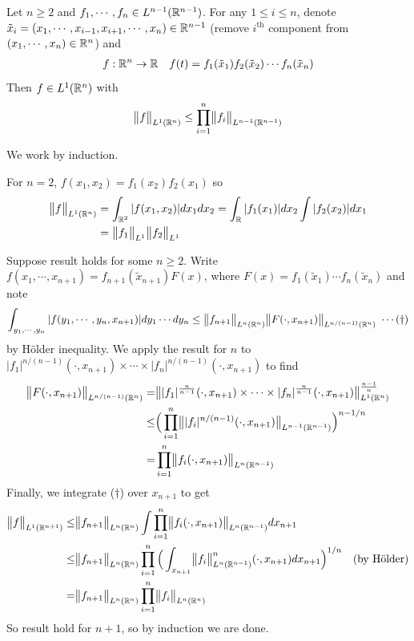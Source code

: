 \documentclass[10pt,a4paper]{report}
\newenvironment{proof}
{\begin{changemargin}{1cm}{0.5cm} 
	}%
	{\end{changemargin}
}
\begin{document}
\lem Let $n\geq 2$ and $f_1, \cdots, f_n \in L^{n-1}(\mathbb{R}^{n-1})$. For any $1\leq i\leq n$, denote $\tilde{x}_i = (x_1, \cdots, x_{i-1}, x_{i+1}, \cdots, x_n) \in \mathbb{R}^{n-1}$ (remove $i^{\text{th}}$ component from $(x_1, \cdots, x_n) \in \mathbb{R}^n$) and
\begin{align*}
f : \mathbb{R}^n \rightarrow \mathbb{R} \quad f(t) = f_1(\tilde{x}_1) f_2(\tilde{x}_2) \cdots f_n(\tilde{x}_n)
\end{align*}
Then $f\in L^1(\mathbb{R}^n)$ with
\begin{align*}
\bigl\lVert f\bigr\rVert_{L^1(\mathbb{R}^n)} \leq \prod_{i=1}^n \bigl\lVert f_i\bigr\rVert_{L^{n-1}(\mathbb{R}^{n-1})}
\end{align*}
\begin{proof}
\pf We work by induction.

\quad For $n=2$, $f(x_1,x_2) = f_1(x_2)f_2(x_1)$ so
\begin{align*}
\bigl\lVert f\bigr\rVert_{L^1(\mathbb{R}^n)} &= \int_{\mathbb{R}^2} |f(x_1,x_2)| dx_1 dx_2 = \int_{\mathbb{R}} |f_1(x_1)| dx_2 \int |f_2(x_2)| dx_1 \\
&= \bigl\lVert f_1\bigr\rVert_{L^1} \bigl\lVert f_2\bigr\rVert_{L^1}
\end{align*}

\quad Suppose result holds for some $n \geq 2$. Write $f(x_1, \cdots, x_{n+1}) = f_{n+1}(\tilde{x}_{n+1}) F(x)$, where $F(x)  = f_1(\tilde{x}_1) \cdots f_n(\tilde{x}_n)$ and note
\begin{align*}
\int_{y_1, \cdots, y_n} |f(y_1,\cdots, y_n, x_{n+1})| dy_1 \cdots dy_n \leq \bigl\lVert f_{n+1}\bigr\rVert_{L^n(\mathbb{R}^n)} \bigl\lVert F(\cdot, x_{n+1})\bigr\rVert_{L^{n/(n-1)}(\mathbb{R}^n)} \,\, \cdots (\dagger)
\end{align*}
by H\"{o}lder inequality. We apply the result for $n$ to $|f_1|^{n/(n-1)}(\cdot, x_{n+1}) \times \cdots \times |f_n|^{n/(n-1)}(\cdot, x_{n+1})$ to find
\begin{align*}
\bigl\lVert F(\cdot, x_{n+1})\bigr\rVert_{L^{n/(n-1)}(\mathbb{R}^{n})} =& \bigl\lVert |f_1|^{\frac{n}{n-1}}(\cdot, x_{n+1}) \times \cdots \times |f_n|^{\frac{n}{n-1}}(\cdot, x_{n+1})\bigr\rVert_{L^1(\mathbb{R}^n)}^{\frac{n-1}{n}} \\
\leq & \Big( \prod_{i=1}^n \bigl\lVert |f_i|^{n/(n-1)} (\cdot, x_{n+1}) \bigr\rVert_{L^{n-1}(\mathbb{R}^{n-1})} \Big)^{n-1/n} \\
= & \prod_{i=1}^n \bigl\lVert f_i (\cdot, x_{n+1})\bigr\rVert_{L^n(\mathbb{R}^{n-1})}
\end{align*}
Finally, we integrate ($\dagger$) over $x_{n+1}$ to get
\begin{align*}
\bigl\lVert f\bigr\rVert_{L^1(\mathbb{R}^{n+1})} \leq & \bigl\lVert f_{n+1}\bigr\rVert_{L^n(\mathbb{R}^n)} \int \prod_{i=1}^n \bigl\lVert f_i(\cdot, x_{n+1})\bigr\rVert_{L^n(\mathbb{R}^{n-1})} dx_{n+1} \\
\leq & \bigl\lVert f_{n+1}\bigr\rVert_{L^n(\mathbb{R}^n)} \prod_{i=1}^n \Big(  \int_{x_{n+1}} \bigl\lVert f_i\bigr\rVert_{L^n(\mathbb{R}^{n-1})}^n (\cdot, x_{n+1}) dx_{n+1}  \Big)^{1/n} \quad \text{(by H\"{o}lder)} \\ 
= & \bigl\lVert f_{n+1}\bigr\rVert_{L^n(\mathbb{R}^n)} \prod_{i=1}^n \bigl\lVert f_i\bigr\rVert_{L^n(\mathbb{R}^n)}
\end{align*}
So result hold for $n+1$, so by induction we are done.

\eop
\end{proof}
\s
\end{document}
